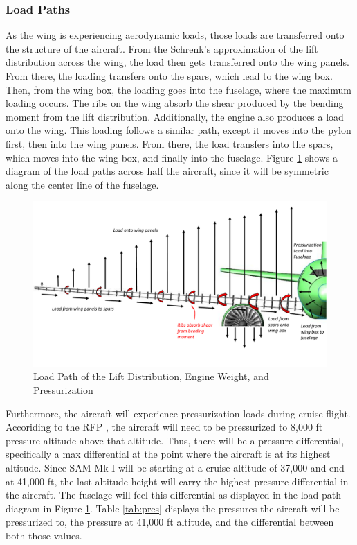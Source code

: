 \subsubsection{Load Paths}
As the wing is experiencing aerodynamic loads, those loads are transferred onto the structure of the aircraft. From the Schrenk's approximation of the lift distribution across the wing, the load then gets transferred onto the wing panels. From there, the loading transfers onto the spars, which lead to the wing box. Then, from the wing box, the loading goes into the fuselage, where the maximum loading occurs. The ribs on the wing absorb the shear produced by the bending moment from the lift distribution. Additionally, the engine also produces a load onto the wing. This loading follows a similar path, except it moves into the pylon first, then into the wing panels. From there, the load transfers into the spars, which moves into the wing box, and finally into the fuselage. Figure \ref{loadpath} shows a diagram of the load paths across half the aircraft, since it will be symmetric along the center line of the fuselage. 

\begin{figure}[H]
    \centering
    \includegraphics[width=1.0\linewidth]{Photos/Load_Path.pdf}
    \caption{Load Path of the Lift Distribution, Engine Weight, and Pressurization}
    \label{loadpath}
\end{figure}

\newpage
Furthermore, the aircraft will experience pressurization loads during cruise flight. Accoriding to the RFP \cite{RFP}, the aircraft will need to be pressurized to 8,000 ft pressure altitude above that altitude. Thus, there will be a pressure differential, specifically a max differential at the point where the aircraft is at its highest altitude. Since SAM Mk I will be starting at a cruise altitude of 37,000 and end at 41,000 ft, the last altitude height will carry the highest pressure differential in the aircraft. The fuselage will feel this differential as displayed in the load path diagram in Figure \ref{loadpath}.
Table \ref{tab:pres} displays the pressures the aircraft will be pressurized to, the pressure at 41,000 ft altitude, and the differential between both those values. 

